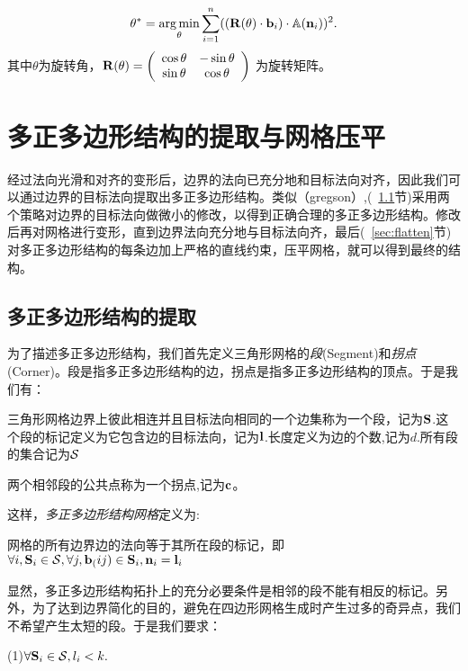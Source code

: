 \begin{equation}\label{equ:rot}
\theta^*=\mathop{\operatorname*{arg\,min}}_{\theta}{\sum_{i=1}^n ( (\mathbf{R}(\theta) \cdot \mathbf{b}_i) \cdot \operatorname*{\mathbb{A}}(\mathbf{n}_i))^2.}
\end{equation}
其中$\theta$为旋转角，$\mathbf{R}(\theta)=\left(\begin{array}{cc}
\cos\theta & -\sin\theta \\ 
\sin\theta & \cos\theta
\end{array}\right) $
为旋转矩阵。

\section{多正多边形结构的提取与网格压平}\label{sec:labeling_flatten}
经过法向光滑和对齐的变形后，边界的法向已充分地和目标法向对齐，因此我们可以通过边界的目标法向提取出多正多边形结构。类似（gregson）,(~\ref{sec:labeling}节)采用两个策略对边界的目标法向做微小的修改，以得到正确合理的多正多边形结构。修改后再对网格进行变形，直到边界法向充分地与目标法向齐，最后(~\ref{sec:flatten}节)对多正多边形结构的每条边加上严格的直线约束，压平网格，就可以得到最终的结构。

\subsection{多正多边形结构的提取}\label{sec:labeling}
为了描述多正多边形结构，我们首先定义三角形网格的\emph{段}(Segment)和\emph{拐点}(Corner)。段是指多正多边形结构的边，拐点是指多正多边形结构的顶点。于是我们有：
\begin{definition}\label{def:seg}
三角形网格边界上彼此相连并且目标法向相同的一个边集称为一个段，记为$\mathbf{S}$.这个段的标记定义为它包含边的目标法向，记为$\mathbf{l}$.长度定义为边的个数,记为$d$.所有段的集合记为$\mathcal{S}$
\end{definition}

\begin{definition}\label{def:corner}
两个相邻段的公共点称为一个拐点,记为$\mathbf{c}$。
\end{definition}
这样，\emph{多正多边形结构网格}定义为:
\begin{definition}
	网格的所有边界边的法向等于其所在段的标记，即
	$\forall i, \mathbf{S}_i \in \mathcal{S}, \forall j, \mathbf{b}_(ij) \in \mathbf{S}_i, \mathbf{n}_i = \mathbf{l}_i$
\end{definition}
显然，多正多边形结构拓扑上的充分必要条件是相邻的段不能有相反的标记。另外，为了达到边界简化的目的，避免在四边形网格生成时产生过多的奇异点，我们不希望产生太短的段。于是我们要求：

(1)$\forall \mathbf{S}_i \in \mathcal{S},l_i<k.$


